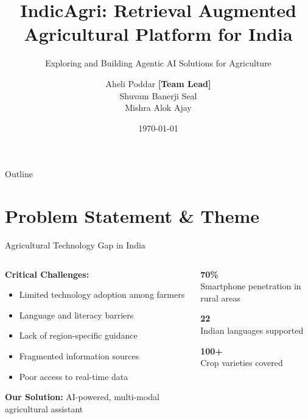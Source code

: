 \documentclass[aspectratio=169]{beamer}
\title[IndicAgri]{IndicAgri: Retrieval Augmented Agricultural Platform for India}
\subtitle{Exploring and Building Agentic AI Solutions for Agriculture}
\author[Team Fibonacci]{Aheli Poddar \textbf{[Team Lead]} \\ Shuvam Banerji Seal \\ Mishra Alok Ajay}
\institute[Capital One]{Capital One Software Engineering Summit}
\date{\today}
\begin{document}
\begin{frame}
\titlepage
\end{frame}

\begin{frame}{Outline}
\tableofcontents[hideallsubsections]
\end{frame}

\section{Problem Statement \& Theme}

\begin{frame}{Agricultural Technology Gap in India}
\begin{columns}
\begin{column}{0.6\textwidth}
\textbf{Critical Challenges:}
\begin{itemize}
\item Limited technology adoption among farmers
\item Language and literacy barriers
\item Lack of region-specific guidance
\item Fragmented information sources
\item Poor access to real-time data
\end{itemize}

\vspace{0.5cm}
\textbf{Our Solution:} AI-powered, multi-modal agricultural assistant
\end{column}
\begin{column}{0.4\textwidth}
\begin{center}
\textcolor{indicgreen}{\textbf{70\%}} \\
Smartphone penetration in rural areas

\vspace{0.3cm}
\textcolor{indicorange}{\textbf{22}} \\
Indian languages supported

\vspace{0.3cm}
\textcolor{indicblue}{\textbf{100+}} \\
Crop varieties covered
\end{center}
\end{column}
\end{columns}
\end{frame}
\end{document}
